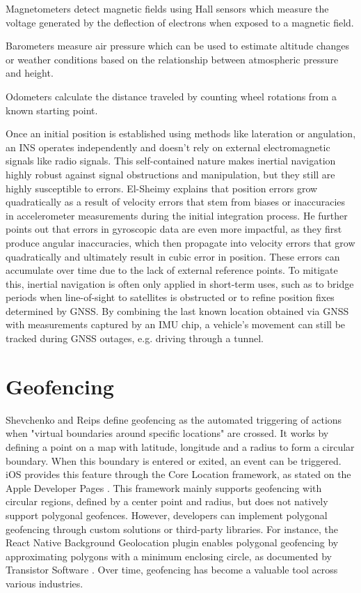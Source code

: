 Magnetometers detect magnetic fields using Hall sensors which measure the voltage generated by the deflection of electrons when exposed to a magnetic field.

Barometers measure air pressure which can be used to estimate altitude changes or weather conditions based on the relationship between atmospheric pressure and height.

Odometers calculate the distance traveled by counting wheel rotations from a known starting point.

Once an initial position is established using methods like lateration or angulation, an \acs{INS} operates independently and doesn't rely on external electromagnetic signals like radio signals. 
This self-contained nature makes inertial navigation highly robust against signal obstructions and manipulation, but they still are highly susceptible to errors.
El-Sheimy \cite{sheimy2006ins} explains that position errors grow quadratically as a result of velocity errors that stem from biases or inaccuracies in accelerometer measurements during the initial integration process. 
He further points out that errors in gyroscopic data are even more impactful, as they first produce angular inaccuracies, which then propagate into velocity errors that grow quadratically and ultimately result in cubic error in position. 
These errors can accumulate over time due to the lack of external reference points. 
To mitigate this, inertial navigation is often only applied in short-term uses, such as to bridge periods when line-of-sight to satellites is obstructed or to refine position fixes determined by \acs{GNSS}. 
By combining the last known location obtained via \acs{GNSS} with measurements captured by an \acs{IMU} chip, a vehicle's movement can still be tracked during GNSS outages, e.g. driving through a tunnel. 

\section{Geofencing}
Shevchenko and Reips \cite{shevchenko2023geofencing} define geofencing as the automated triggering of actions when "virtual boundaries around specific locations" are crossed. 
It works by defining a point on a map with latitude, longitude and a radius to form a circular boundary. 
When this boundary is entered or exited, an event can be triggered.  
iOS provides this feature through the Core Location framework, as stated on the Apple Developer Pages \cite{apple_geofencing}. 
This framework mainly supports geofencing with circular regions, defined by a center point and radius, but does not natively support polygonal geofences. 
However, developers can implement polygonal geofencing through custom solutions or third-party libraries. 
For instance, the React Native Background Geolocation plugin enables polygonal geofencing by approximating polygons with a minimum enclosing circle, as documented by Transistor Software \cite{transistorsoft_geofence}.  
Over time, geofencing has become a valuable tool across various industries.  


